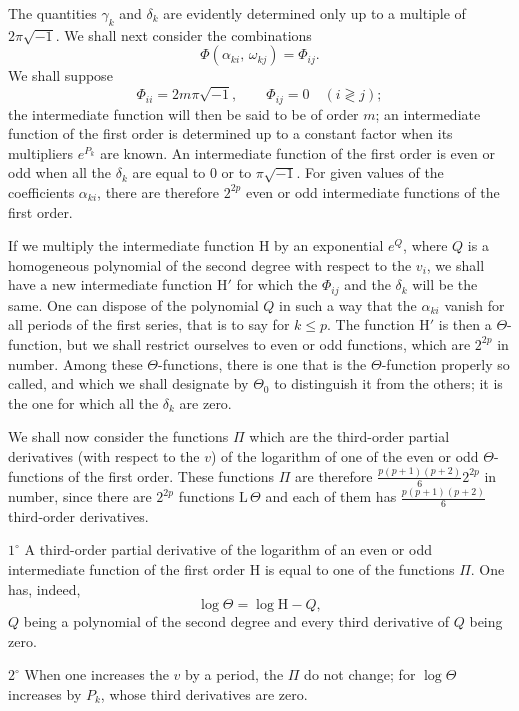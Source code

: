 \documentclass{article}
\begin{document}
The quantities $\gamma_{k}$ and $\delta_{k}$ are evidently determined only up to a multiple of $2\pi\sqrt{-1}$. We shall next consider the combinations
\[
\Phi(\alpha_{ki},\, \omega_{kj}) = \Phi_{ij}.
\]
We shall suppose
\[
\Phi_{ii} = 2m\pi\sqrt{-1}, \qquad \Phi_{ij} = 0 \quad (i \gtrless j); \tag{5}
\]
the intermediate function will then be said to be of order $m$; an intermediate function of the first order is determined up to a constant factor when its
multipliers $e^{P_{k}}$ are known. An intermediate function of the first order is even or odd when all the $\delta_{k}$ are equal to 0 or to $\pi\sqrt{-1}$. For given values of the coefficients $\alpha_{ki}$, there are therefore $2^{2p}$ even or odd intermediate functions of the first order.

If we multiply the intermediate function $\mathrm{H}$ by an exponential $e^{Q}$, where $Q$ is a homogeneous polynomial of the second degree with respect to the $v_{i}$, we shall have a new intermediate function $\mathrm{H}'$ for which the $\Phi_{ij}$ and the $\delta_{k}$ will be the same. One can dispose of the polynomial $Q$ in such a way that the $\alpha_{ki}$ vanish for all periods of the first series, that is to say for $k \le p$. The function $\mathrm{H}'$ is then a $\Theta$-function, but we shall restrict ourselves to even or odd functions, which are $2^{2p}$ in number. Among these $\Theta$-functions, there is one that is the $\Theta$-function properly so called, and which we shall designate by $\Theta_{0}$ to distinguish it from the others; it is the one for which all the $\delta_{k}$ are zero.

We shall now consider the functions $\Pi$ which are the third-order partial derivatives (with respect to the $v$) of the logarithm of one of the even or odd $\Theta$-functions of the first order. These functions $\Pi$ are therefore $\frac{p(p+1)(p+2)}{6} 2^{2p}$ in number, since there are $2^{2p}$ functions $\mathrm{L}\,\Theta$ and each of them has $\frac{p(p+1)(p+2)}{6}$ third-order derivatives.

$1^{\circ}$ A third-order partial derivative of the logarithm of an even or odd intermediate function of the first order $\mathrm{H}$ is equal to one of the functions $\Pi$. One has, indeed,
\[
\log\Theta = \log\mathrm{H} - Q,
\]
$Q$ being a polynomial of the second degree and every third derivative of $Q$ being zero.

$2^{\circ}$ When one increases the $v$ by a period, the $\Pi$ do not change; for $\log\Theta$ increases by $P_{k}$, whose third derivatives are zero.
\end{document}
